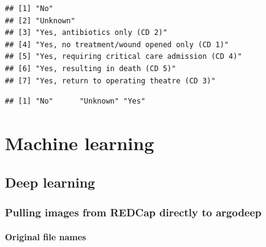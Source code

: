 \documentclass[]{book}
\newenvironment{Shaded}{\begin{snugshade}}{\end{snugshade}}
\newcommand{\CommentTok}[1]{\textcolor[rgb]{0.56,0.35,0.01}{\textit{#1}}}
\newcommand{\DataTypeTok}[1]{\textcolor[rgb]{0.13,0.29,0.53}{#1}}
\newcommand{\KeywordTok}[1]{\textcolor[rgb]{0.13,0.29,0.53}{\textbf{#1}}}
\newcommand{\NormalTok}[1]{#1}
\newcommand{\OperatorTok}[1]{\textcolor[rgb]{0.81,0.36,0.00}{\textbf{#1}}}
\newcommand{\StringTok}[1]{\textcolor[rgb]{0.31,0.60,0.02}{#1}}
\begin{document}
\begin{verbatim}
## [1] "No"                                           
## [2] "Unknown"                                      
## [3] "Yes, antibiotics only (CD 2)"                 
## [4] "Yes, no treatment/wound opened only (CD 1)"   
## [5] "Yes, requiring critical care admission (CD 4)"
## [6] "Yes, resulting in death (CD 5)"               
## [7] "Yes, return to operating theatre (CD 3)"
\end{verbatim}

\begin{Shaded}
\end{Shaded}

\begin{verbatim}
## [1] "No"      "Unknown" "Yes"
\end{verbatim}

\hypertarget{machine-learning}{%
\chapter{Machine learning}\label{machine-learning}}

\hypertarget{deep-learning}{%
\section{Deep learning}\label{deep-learning}}

\hypertarget{pulling-images-from-redcap-directly-to-argodeep}{%
\subsection{Pulling images from REDCap directly to argodeep}\label{pulling-images-from-redcap-directly-to-argodeep}}

\hypertarget{original-file-names}{%
\subsubsection{Original file names}\label{original-file-names}}
\end{document}
